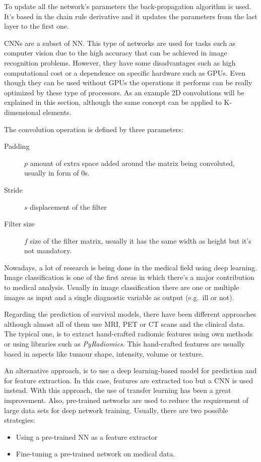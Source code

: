 To update all the network's parameters the back-propagation algorithm is used. It's based
in the chain rule derivative and it updates the parameters from the last layer to the first
one.
~\cite{neural:efficient-backprop}



\glspl{CNN} are a subset of \gls{NN}. This type of networks are used for tasks such as computer vision
due to the high accuracy that can be achieved in image recognition problems. However, they have
some disadvantages such as high computational cost or a dependence on specific hardware such as GPUs.
Even though they can be used without GPUs the operations it performs can be really optimized by these
type of processors. As an example 2D convolutions will be explained in this section, although the 
same concept can be applied to K-dimensional elements.

The convolution operation is defined by three parameters:
\begin{description}
  \item[Padding] \( p \) amount of extra space added around the matrix being convoluted, usually in
  form of 0s.
  \item[Stride] \( s \) displacement of the filter
  \item[Filter size] \( f \) size of the filter matrix, usually it has the same width as height but
  it's not mandatory.
\end{description}



Nowadays, a lot of research is being done in the medical field using deep learning. Image
classification is one of the first areas in which there's a major contribution to medical analysis.
Usually in image classification there are one or multiple images as input and a single diagnostic 
variable as output (e.g.~ill or not).
~\cite{medical:survey-deep-learning}

Regarding the prediction of survival models, there have been different approaches although
almost all of them use \gls{MRI}, \gls{PET} or \gls{CT} scans and the clinical data. 
The typical one, is to extract hand-crafted radiomic features using own methods or using 
libraries such as \emph{PyRadiomics}. This 
hand-crafted features are usually based in aspects like tumour shape, intensity, volume or texture.
~\cites{medical:tumour-radiomics}{medical:py-radiomics}{medical:computational-radiomics}

An alternative approach, is to use a deep learning-based model for prediction and for feature
extraction. In this case, features are extracted too but a \gls{CNN} 
is used instead. With this approach, the use of transfer learning has been a
great improvement. Also, pre-trained networks are used to reduce the requirement of large data
sets for deep network training. Usually, there are two possible strategies: 
\begin{itemize}
  \item Using a pre-trained NN as a feature extractor
  \item Fine-tuning a pre-trained network on medical data.
\end{itemize}

